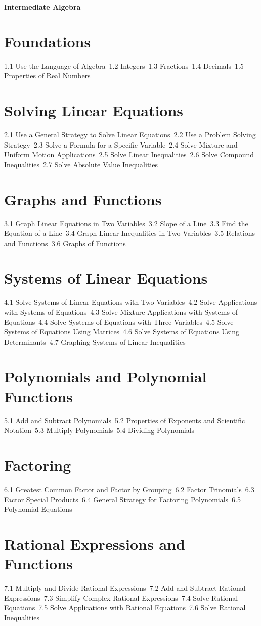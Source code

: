 {\LARGE \bf{Intermediate Algebra}}
\section{Foundations}
1.1 Use the Language of Algebra\
1.2 Integers\
1.3 Fractions\
1.4 Decimals\
1.5 Properties of Real Numbers\
\section{Solving Linear Equations}
2.1 Use a General Strategy to Solve Linear Equations\
2.2 Use a Problem Solving Strategy\
2.3 Solve a Formula for a Specific Variable\
2.4 Solve Mixture and Uniform Motion Applications\
2.5 Solve Linear Inequalities\
2.6 Solve Compound Inequalities\
2.7 Solve Absolute Value Inequalities\
\section{Graphs and Functions}
3.1 Graph  Linear Equations in Two Variables\
3.2 Slope of a Line\
3.3 Find the Equation of a Line\
3.4 Graph Linear Inequalities in Two Variables\
3.5 Relations and Functions\
3.6 Graphs of Functions\
\section{Systems of Linear Equations}
4.1 Solve Systems of Linear Equations with Two Variables\
4.2 Solve Applications with Systems of Equations\
4.3 Solve Mixture Applications with Systems of Equations\
4.4 Solve Systems of Equations with Three Variables\
4.5 Solve Systems of Equations Using Matrices\
4.6 Solve Systems of Equations Using Determinants\
4.7 Graphing Systems of Linear Inequalities\
\section{Polynomials and Polynomial Functions}
5.1 Add and Subtract Polynomials\
5.2 Properties of Exponents and Scientific Notation\
5.3 Multiply Polynomials\
5.4 Dividing Polynomials\
\section{Factoring}
6.1 Greatest Common Factor and Factor by Grouping\
6.2 Factor Trinomials\
6.3 Factor Special Products\
6.4 General Strategy for Factoring Polynomials\
6.5 Polynomial Equations\
\section{Rational Expressions and Functions}
7.1 Multiply and Divide Rational Expressions\
7.2 Add and Subtract Rational Expressions\
7.3 Simplify Complex Rational Expressions\
7.4 Solve Rational Equations\
7.5 Solve Applications with Rational Equations\
7.6 Solve Rational Inequalities\
